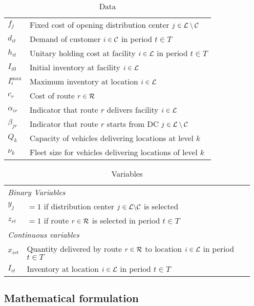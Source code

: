 \documentclass[a4paper,10pt]{article}
\begin{document}
\begin{linenumbers}
\begin{table}[htbp]
	\centering
	\begin{tabular}{ll}
		\toprule
		$f_j$ & Fixed cost of opening distribution center $j\in\mathcal{L} \setminus \mathcal{C}$\\ 
		$d_{it}$ & Demand of customer $i\in\mathcal{C}$ in period $t \in T$\\
		$h_{it}$ & Unitary holding cost at facility $i\in\mathcal{L}$ in period $t \in T$\\
		$I_{i0}$ & Initial inventory at facility $i\in \mathcal{L}$\\
		$I_i^{\max}$ & Maximum inventory at location $i\in\mathcal{L}$\\
		$c_r$ & Cost of route $r\in \mathcal{R}$\\
		$\alpha_{ir}$ & Indicator that route $r$ delivers facility $i \in \mathcal{L}$\\
		$\beta_{jr}$ & Indicator that route $r$ starts from DC $j \in \mathcal{L} \setminus \mathcal{C}$\\
		$Q_k$ & Capacity of vehicles delivering locations at level $k$\\ 
		$\nu_k$ & Fleet size for vehicles delivering locations of level $k$\\ 
		\bottomrule
	\end{tabular}
	\caption{Data}
	\label{tab:data}
\end{table}       


	\begin{table}[htbp]
	\centering
	\begin{tabular}{ll}
		\toprule
		\multicolumn{2}{l}{\textit{Binary Variables}}\\
		$y_{j}$ & $=1$ if distribution center $j \in \mathcal{L} \backslash \mathcal{C}$ is selected \\
		$z_{rt}$ & $=1$ if route $r \in \mathcal{R}$  is selected in period $t \in T$\\
		\midrule
		\multicolumn{2}{l}{\textit{Continuous variables}}\\
		$x_{irt}$ & Quantity delivered by route $r \in \mathcal{R}$ to location $i\in \mathcal{L}$ in period $t\in T$\\
		$I_{it}$ &  Inventory at location $i \in \mathcal{L}$ in period $t \in T$\\
		\bottomrule
	\end{tabular}
	\caption{Variables}
	\label{tab:var}
\end{table}    


\subsection{Mathematical  formulation}\label{subsection:MIP}


\end{linenumbers}
\end{document}
